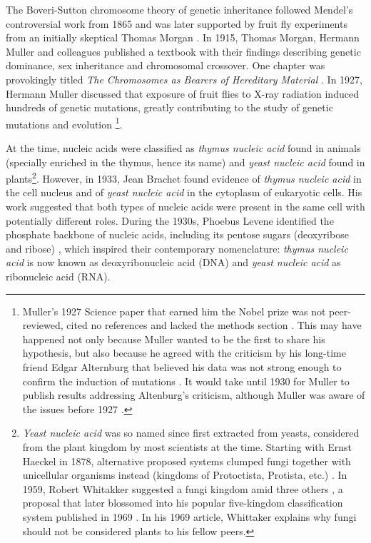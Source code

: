 The Boveri-Sutton chromosome theory of genetic inheritance followed Mendel's controversial \cite{} work from 1865 \cite{sutton:1902tx} and was later supported by fruit fly experiments from an initially skeptical \cite{} Thomas Morgan \cite{morgan:1915tw}. In 1915, Thomas Morgan, Hermann Muller and colleagues published a textbook with their findings describing genetic dominance, sex inheritance and chromosomal crossover. One chapter was provokingly titled \emph{The Chromosomes as Bearers of Hereditary Material} \cite{morgan:1915tw}. In 1927, Hermann Muller discussed that exposure of fruit flies to X-ray radiation induced hundreds of genetic mutations, greatly contributing to the study of genetic mutations and evolution \cite{muller:1927wl} \footnote{Muller's 1927 Science paper \cite{muller:1927wl} that earned him the Nobel prize was not peer-reviewed, cited no references and lacked the methods section \cite{calabrese:2018vl}. This may have happened not only because Muller wanted to be the first to share his hypothesis, but also because he agreed with the criticism by his long-time friend Edgar Alternburg that believed his data was not strong enough to confirm the induction of mutations \cite{calabrese:2018vl}. It would take until 1930 for Muller to publish results addressing Altenburg's criticism, although Muller was aware of the issues before 1927 \cite{calabrese:2018vl}.}.


At the time, nucleic acids were classified as \emph{thymus nucleic acid} found in animals (specially enriched in the thymus, hence its name) and \emph{yeast nucleic acid} found in plants\footnote{\emph{Yeast nucleic acid} was so named since first extracted from yeasts, considered from the plant kingdom by most scientists at the time. Starting with Ernst Haeckel in 1878, alternative proposed systems clumped fungi together with unicellular organisms instead (kingdoms of Protoctista, Protista, etc.) \cite{haeckel:1878tz}. In 1959, Robert Whitakker suggested a fungi kingdom amid three others \cite{whittaker:1959to}, a proposal that later blossomed into his popular five-kingdom classification system published in 1969 \cite{whittaker:1969to}. In his 1969 article, Whittaker explains why fungi should not be considered plants to his fellow peers.}. However, in 1933, Jean Brachet found evidence of \emph{thymus nucleic acid} in the cell nucleus and of \emph{yeast nucleic acid} in the cytoplasm of eukaryotic cells. His work suggested that both types of nucleic acids were present in the same cell with potentially different roles. During the 1930s, Phoebus Levene identified the phosphate backbone of nucleic acids, including its pentose sugars (deoxyribose and ribose) \cite{levene:1929ug}, which inspired their contemporary nomenclature: \emph{thymus nucleic acid} is now known as deoxyribonucleic acid (DNA) and \emph{yeast nucleic acid} as ribonucleic acid (RNA).


